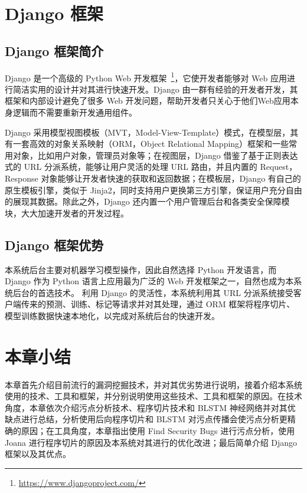 \section{Django 框架}
\subsection{Django 框架简介}
Django 是一个高级的 Python Web 开发框架~\footnote{\url{https://www.djangoproject.com/}}，它使开发者能够对 Web 应用进行简洁实用的设计并对其进行快速开发。Django 由一群有经验的开发者开发，其框架和内部设计避免了很多 Web 开发问题，帮助开发者只关心于他们Web应用本身逻辑而不需要重新开发通用组件。

Django 采用模型视图模板（MVT，Model-View-Template）模式，在模型层，其有一套高效的对象关系映射（ORM，Object Relational Mapping）框架和一些常用对象，比如用户对象，管理员对象等；在视图层，Django 借鉴了基于正则表达式的 URL 分派系统，能够让用户灵活的处理 URL 路由，并且内置的 Request，Response 对象能够让开发者快速的获取和返回数据；在模板层，Django 有自己的原生模板引擎，类似于 Jinja2，同时支持用户更换第三方引擎，保证用户充分自由的展现其数据。除此之外，Django 还内置一个用户管理后台和各类安全保障模块，大大加速开发者的开发过程。

\subsection{Django 框架优势}
本系统后台主要对机器学习模型操作，因此自然选择 Python 开发语言，而 Django 作为 Python 语言上应用最为广泛的 Web 开发框架之一，自然也成为本系统后台的首选技术。
利用 Django 的灵活性，本系统利用其 URL 分派系统接受客户端传来的预测、训练、标记等请求并对其处理，通过 ORM 框架将程序切片、模型训练数据快速本地化，以完成对系统后台的快速开发。

\section{本章小结}
本章首先介绍目前流行的漏洞挖掘技术，并对其优劣势进行说明，接着介绍本系统使用的技术、工具和框架，并分别说明使用这些技术、工具和框架的原因。在技术角度，本章依次介绍污点分析技术、程序切片技术和 BLSTM 神经网络并对其优缺点进行总结，分析使用后向程序切片和 BLSTM 对污点传播会使污点分析更精确的原因；在工具角度，本章指出使用 Find Security Bugs 进行污点分析，使用 Joana 进行程序切片的原因及本系统对其进行的优化改进；最后简单介绍 Django 框架以及其优点。